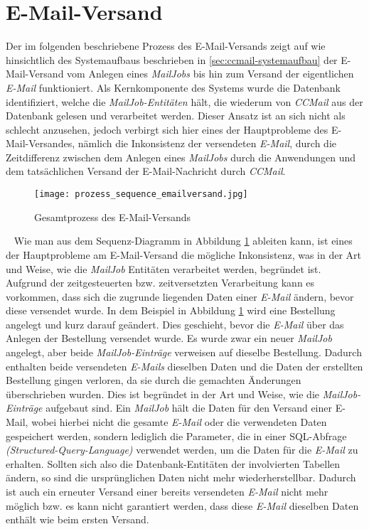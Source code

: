 \section{E-Mail-Versand}
\label{sec:ccmail-email-versand}
Der im folgenden beschriebene Prozess des E-Mail-Versands zeigt auf wie hinsichtlich des Systemaufbaus beschrieben in \ref{sec:ccmail-systemaufbau} der E-Mail-Versand vom Anlegen eines \emph{MailJobs} bis hin zum Versand der eigentlichen \emph{E-Mail} funktioniert. 
\newline
\newline
Als Kernkomponente des Systems wurde die Datenbank identifiziert, welche die \emph{MailJob-Entitäten} hält, die wiederum von \emph{CCMail} aus der Datenbank gelesen und verarbeitet werden. Dieser Ansatz ist an sich nicht als schlecht anzusehen, jedoch verbirgt sich hier eines der Hauptprobleme des E-Mail-Versandes, nämlich die Inkonsistenz der versendeten \emph{E-Mail}, durch die Zeitdifferenz zwischen dem Anlegen eines \emph{MailJobs} durch die Anwendungen und dem tatsächlichen Versand der E-Mail-Nachricht durch \emph{CCMail}.
\begin{figure}[h]
\centering
\texttt{[image: prozess\_sequence\_emailversand.jpg]}
\caption{Gesamtprozess des E-Mail-Versands}
\label{fig:sequence-diagramm-gesamtprozess}
\end{figure}
\ \newline
Wie man aus dem Sequenz-Diagramm in Abbildung \ref{fig:sequence-diagramm-gesamtprozess} ableiten kann, ist eines der Hauptprobleme am E-Mail-Versand die mögliche Inkonsistenz, was in der Art und Weise, wie die \emph{MailJob} Entitäten verarbeitet werden, begründet ist. Aufgrund der zeitgesteuerten bzw. zeitversetzten Verarbeitung kann es vorkommen, dass sich die zugrunde liegenden Daten einer \emph{E-Mail} ändern, bevor diese versendet wurde. In dem Beispiel in Abbildung \ref{fig:sequence-diagramm-gesamtprozess} wird eine Bestellung angelegt und kurz darauf geändert. Dies geschieht, bevor die \emph{E-Mail} über das Anlegen der Bestellung versendet wurde. Es wurde zwar ein neuer \emph{MailJob} angelegt, aber beide \emph{MailJob-Einträge} verweisen auf dieselbe Bestellung. Dadurch enthalten beide versendeten \emph{E-Mails} dieselben Daten und die Daten der erstellten Bestellung gingen verloren, da sie durch die gemachten Änderungen überschrieben wurden. 
\newpage
Dies ist begründet in der Art und Weise, wie die \emph{MailJob-Einträge} aufgebaut sind. Ein \emph{MailJob} hält die Daten für den Versand einer E-Mail, wobei hierbei nicht die gesamte \emph{E-Mail} oder die verwendeten Daten gespeichert werden, sondern lediglich die Parameter, die in einer SQL-Abfrage \emph{(Structured-Query-Language)} verwendet werden, um die Daten für die \emph{E-Mail} zu erhalten. Sollten sich also die Datenbank-Entitäten der involvierten Tabellen ändern, so sind die ursprünglichen Daten nicht mehr wiederherstellbar. Dadurch ist auch ein erneuter Versand einer bereits versendeten \emph{E-Mail} nicht mehr möglich bzw. es kann nicht garantiert werden, dass diese \emph{E-Mail} dieselben Daten enthält wie beim ersten Versand.
